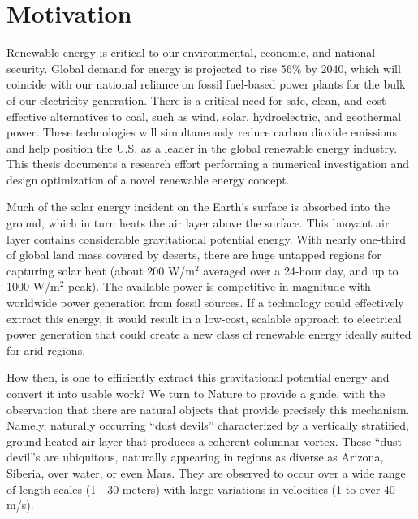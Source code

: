 \label{sec:intro}

%
%


\section{Motivation}

Renewable energy is critical to our environmental, economic, and
national security. Global demand for energy is projected to rise 56\% by
2040\cite{energy-outlook}, which will coincide with our national
reliance on fossil fuel-based power plants for the bulk of our
electricity generation. There is a critical need for safe, clean, and 
cost-effective alternatives to coal, such as wind, solar, hydroelectric,
and geothermal power. These technologies will simultaneously reduce
carbon dioxide emissions and help position the U.S. as a leader in the
global renewable energy industry. 
%
This thesis documents a research effort performing a numerical 
investigation and design optimization of a novel renewable energy concept. 

Much of the solar energy incident on the Earth's surface is absorbed
into the ground, which in turn heats the air layer above the surface.
This buoyant air layer contains considerable gravitational potential
energy. 
With nearly one-third of global land mass covered by deserts, there are huge
untapped regions for capturing solar heat (about 200 W/$\text{m}^2$
averaged over a 24-hour day, and up to 1000 W/$\text{m}^2$
peak)\cite{Hoyt197827}. The available power is competitive in magnitude
with worldwide power generation from fossil sources. If a technology
could effectively extract this energy, it would result in a low-cost,
scalable approach to electrical power generation that could create a new
class of renewable energy ideally suited for arid regions.  

How then, is one to efficiently extract this gravitational potential
energy and convert it into usable work? We turn to Nature to provide a 
guide, with the observation that there are natural objects that provide
precisely this mechanism. Namely, naturally occurring ``dust devils'' 
characterized by a vertically stratified, ground-heated air layer
that produces a coherent columnar vortex. These ``dust devil''s are
ubiquitous, naturally appearing in regions as diverse as Arizona,
Siberia, over water, or even
Mars\cite{Sinclair1969,ROG:ROG1635,JGRE:JGRE1660}.  
They are observed to occur over a wide range of length scales (1 - 30
meters) with large variations in velocities (1 to over 40
m/s)\cite{Sinclair1969}. 

